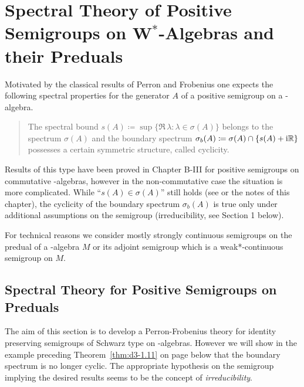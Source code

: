 

\chapter{Spectral Theory of Positive Semigroups on W$^{*}$-Algebras and their Preduals}\label{chap:D-III}
Motivated by the classical results of Perron and Frobenius one expects the following spectral properties for the generator $A$ of a positive semigroup on a \CA-algebra. 
\begin{quote}
The spectral bound 
$s(A) \coloneqq \sup\{\Re\,\lambda \colon \lambda \in \sigma(A)\}$ belongs to the spectrum $\sigma(A)$ and the boundary spectrum
$  %
\sigma_{b}(A) \coloneqq \sigma(A) \cap \{s(A)+\im\R\}
$  %
possesses a certain symmetric structure, called cyclicity.
\end{quote}
Results of this type have been proved in Chapter B-III for positive semigroups on commutative \CA-algebras, however in the non-commutative case the situation is more complicated.
While \enquote{$s(A) \in \sigma(A)$} still holds (see \citet{greinervoigtwolff:1981} or the notes of this chapter), the cyclicity of the boundary spectrum $\sigma_{b}(A)$ is true only under additional assumptions on the semigroup (\eg irreducibility, see Section 1 below).

For technical reasons we consider mostly strongly continuous semigroups on the predual of a \WA-algebra $M$ or its adjoint semigroup which is a weak*-continuous semigroup on $M$.
\section{Spectral Theory for Positive Semigroups on Preduals}\label{sec:d3-1}
The aim of this section is to develop a Perron-Frobenius theory for identity preserving semigroups of Schwarz type on \WA-algebras.
However we will show in the example preceding Theorem~\ref{thm:d3-1.11} on page \pageref{thm:d3-1.11} below that the boundary spectrum is no longer cyclic.
The appropriate hypothesis on the semigroup implying the desired results seems to be the concept of \emph{irreducibility}.

